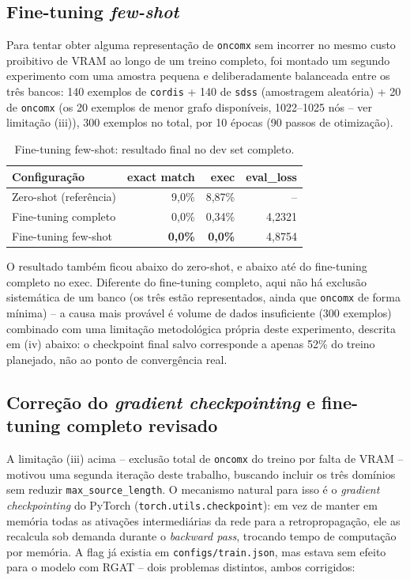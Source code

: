 \subsection{Fine-tuning \emph{few-shot}}
\label{sec:finetuning-fewshot}

Para tentar obter alguma representação de \texttt{oncomx} sem incorrer no
mesmo custo proibitivo de VRAM ao longo de um treino completo, foi montado
um segundo experimento com uma amostra pequena e deliberadamente balanceada
entre os três bancos: 140 exemplos de \texttt{cordis} + 140 de
\texttt{sdss} (amostragem aleatória) + 20 de \texttt{oncomx} (os 20 exemplos
de menor grafo disponíveis, 1022--1025 nós -- ver limitação (iii)), 300
exemplos no total, por 10 épocas (90 passos de otimização).

\begin{table}[h]
\centering
\caption{Fine-tuning few-shot: resultado final no dev set completo.}
\label{tab:finetuning-fewshot}
\begin{tabular}{lrrr}
\toprule
\textbf{Configuração} & \textbf{exact match} & \textbf{exec} & \textbf{eval\_loss} \\
\midrule
Zero-shot (referência)  & 9,0\%  & 8,87\% & -- \\
Fine-tuning completo     & 0,0\%  & 0,34\% & 4,2321 \\
Fine-tuning few-shot     & \textbf{0,0\%} & \textbf{0,0\%} & 4,8754 \\
\bottomrule
\end{tabular}
\end{table}

O resultado também ficou abaixo do zero-shot, e abaixo até do fine-tuning
completo no exec. Diferente do fine-tuning completo, aqui não há exclusão
sistemática de um banco (os três estão representados, ainda que
\texttt{oncomx} de forma mínima) -- a causa mais provável é volume de
dados insuficiente (300 exemplos) combinado com uma limitação metodológica
própria deste experimento, descrita em (iv) abaixo: o checkpoint final
salvo corresponde a apenas 52\% do treino planejado, não ao ponto de
convergência real.

\subsection{Correção do \emph{gradient checkpointing} e fine-tuning completo revisado}
\label{sec:gc-fix}

A limitação (iii) acima -- exclusão total de \texttt{oncomx} do treino por
falta de VRAM -- motivou uma segunda iteração deste trabalho, buscando
incluir os três domínios sem reduzir \texttt{max\_source\_length}. O
mecanismo natural para isso é o \emph{gradient checkpointing} do PyTorch
(\texttt{torch.utils.checkpoint}): em vez de manter em memória todas as
ativações intermediárias da rede para a retropropagação, ele as recalcula
sob demanda durante o \emph{backward pass}, trocando tempo de computação por
memória. A flag já existia em \texttt{configs/train.json}, mas estava sem
efeito para o modelo com RGAT -- dois problemas distintos, ambos
corrigidos:

